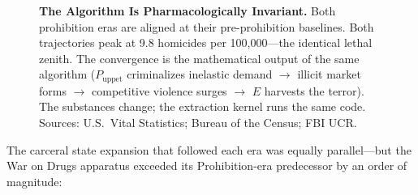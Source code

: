 \begin{figure}[htbp]
\begin{tikzpicture}
\end{tikzpicture}
\caption{\textbf{The Algorithm Is Pharmacologically Invariant.} Both prohibition eras are aligned at their pre-prohibition baselines. Both trajectories peak at 9.8 homicides per 100,000---the identical lethal zenith. The convergence is the mathematical output of the same algorithm ($P_{\text{uppet}}$ criminalizes inelastic demand $\rightarrow$ illicit market forms $\rightarrow$ competitive violence surges $\rightarrow$ $E$ harvests the terror). The substances change; the extraction kernel runs the same code. Sources: U.S.\ Vital Statistics; Bureau of the Census; FBI UCR.}
\label{fig:dual_era_homicide}
\end{figure}

The carceral state expansion that followed each era was equally parallel---but the War on Drugs apparatus exceeded its Prohibition-era predecessor by an order of magnitude:

